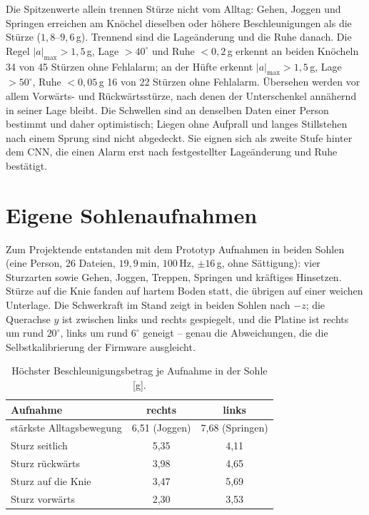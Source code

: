 \documentclass[11pt,a4paper,oneside]{report}
\begin{document}
Die Spitzenwerte allein trennen Stürze nicht vom Alltag: Gehen,
Joggen und Springen erreichen am Knöchel dieselben oder höhere
Beschleunigungen als die Stürze ($1{,}8$--$9{,}6$\,g). Trennend sind
die Lageänderung und die Ruhe danach. Die Regel
$|a|_{\max} > 1{,}5$\,g, Lage $> 40^{\circ}$ und Ruhe $< 0{,}2$\,g
erkennt an beiden Knöcheln 34 von 45 Stürzen ohne Fehlalarm; an der
Hüfte erkennt $|a|_{\max} > 1{,}5$\,g, Lage $> 50^{\circ}$, Ruhe
$< 0{,}05$\,g 16 von 22 Stürzen ohne Fehlalarm. Übersehen werden vor
allem Vorwärts- und Rückwärtsstürze, nach denen der Unterschenkel
annähernd in seiner Lage bleibt. Die Schwellen sind an denselben
Daten einer Person bestimmt und daher optimistisch; Liegen ohne
Aufprall und langes Stillstehen nach einem Sprung sind nicht
abgedeckt. Sie eignen sich als zweite Stufe hinter dem CNN, die einen
Alarm erst nach festgestellter Lageänderung und Ruhe bestätigt.

\section{Eigene Sohlenaufnahmen}
\label{sec:fuss_sohle}

Zum Projektende entstanden mit dem Prototyp Aufnahmen in beiden Sohlen
(eine Person, 26 Dateien, $19{,}9$\,min, $100$\,Hz, $\pm 16$\,g, ohne
Sättigung): vier Sturzarten sowie Gehen, Joggen, Treppen, Springen und
kräftiges Hinsetzen. Stürze auf die Knie fanden auf hartem Boden statt,
die übrigen auf einer weichen Unterlage. Die Schwerkraft im Stand zeigt
in beiden Sohlen nach $-z$; die Querachse $y$ ist zwischen links und
rechts gespiegelt, und die Platine ist rechts um rund $20^{\circ}$,
links um rund $6^{\circ}$ geneigt -- genau die Abweichungen, die die
Selbstkalibrierung der Firmware ausgleicht.

\begin{table}[H]
\centering
\caption{Höchster Beschleunigungsbetrag je Aufnahme in der Sohle [g].}
\label{tab:fuss_sohle}
\small
\begin{tabularx}{0.8\textwidth}{X c c}
\toprule
\textbf{Aufnahme} & \textbf{rechts} & \textbf{links} \\
\midrule
stärkste Alltagsbewegung & 6{,}51 (Joggen) & 7{,}68 (Springen) \\
Sturz seitlich           & 5{,}35 & 4{,}11 \\
Sturz rückwärts          & 3{,}98 & 4{,}65 \\
Sturz auf die Knie       & 3{,}47 & 5{,}69 \\
Sturz vorwärts           & 2{,}30 & 3{,}53 \\
\bottomrule
\end{tabularx}
\end{table}
\end{document}
